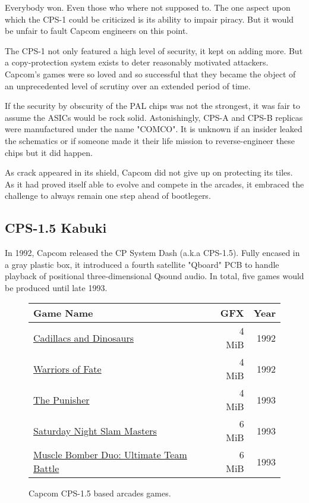 Everybody won. Even those who where not supposed to. The one aspect upon which the CPS-1 could be criticized is its ability to impair piracy. But it would be unfair to fault Capcom engineers on this point.

 The CPS-1 not only featured a high level of security, it kept on adding more. But a copy-protection system exists to deter reasonably motivated attackers. Capcom's games were so loved and so successful that they became the object of an unprecedented level of scrutiny over an extended period of time.

If the security by obscurity of the PAL chips was not the strongest, it was fair to assume the ASICs would be rock solid. Astonishingly, CPS-A and CPS-B replicas were manufactured under the name "COMCO"\cite{arcadeHackerCPS1}. It is unknown if an insider leaked the schematics or if someone made it their life mission to reverse-engineer these chips but it did happen.

As crack appeared in its shield, Capcom did not give up on protecting its tiles. As it had proved itself able to evolve and compete in the arcades, it  embraced the challenge to always remain one step ahead of bootlegers.

\subsection{CPS-1.5 Kabuki}
In 1992, Capcom released the CP System Dash (a.k.a CPS-1.5). Fully encased in a gray plastic box, it introduced a fourth satellite "Qboard" PCB to handle playback of positional three-dimensional Qsound audio. In total, five games would be produced until late 1993.

\begin{figure}[H]
{ \setlength{\tabcolsep}{3.0pt}
\begin{tabularx}{\textwidth}{Xrr}
  \toprule    
  \textbf{Game Name} & \textbf{ GFX }  & \textbf{ Year } \\               
  \toprule    
\href{}{Cadillacs and Dinosaurs} & 4 MiB & 1992 \\ 
\href{}{Warriors of Fate} & 4 MiB & 1992 \\ 
\href{}{The Punisher} & 4 MiB & 1993 \\ 
\href{}{Saturday Night Slam Masters} & 6 MiB & 1993 \\ 
\href{}{Muscle Bomber Duo: Ultimate Team Battle} & 6 MiB & 1993 \\ 
  \toprule    
\end{tabularx}%
}\caption*{Capcom CPS-1.5 based arcades games.}
\end{figure}

